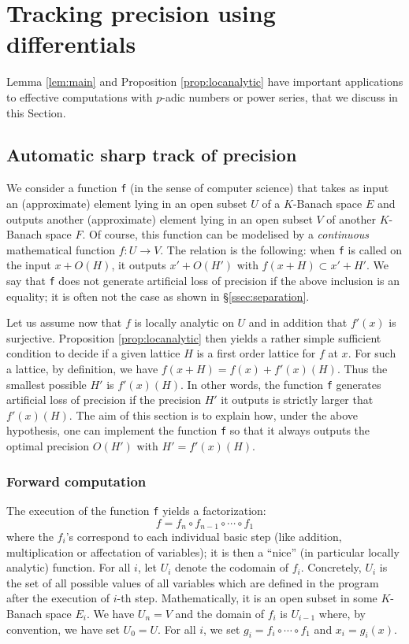 \documentclass{lms}
\begin{document}
\section{Tracking precision using differentials}
\label{sec:tracking}

Lemma \ref{lem:main} and Proposition \ref{prop:locanalytic} have 
important applications to effective computations with $p$-adic numbers 
or power series, that we discuss in this Section. 

\subsection{Automatic sharp track of precision}

We consider a function {\tt f} (in the sense of computer 
science) that takes as input an (approximate) element lying in an open 
subset $U$ of a $K$-Banach space $E$ and outputs another (approximate) 
element lying in an open subset $V$ of another $K$-Banach space $F$. Of 
course, this function can be modelised by a \emph{continuous} 
mathematical function $f : U \to V$. The relation is the following: when 
{\tt f} is called on the input $x + O(H)$, it outputs $x' + O(H')$ with 
$f(x+H) \subset x' + H'$. We say that {\tt f} does not generate 
artificial loss of precision if the above inclusion is an equality; it is 
often not the case as shown in \S \ref{ssec:separation}.

Let us assume now that $f$ is locally analytic on $U$ and in addition 
that $f'(x)$ is surjective. Proposition \ref{prop:locanalytic} then 
yields a rather simple sufficient condition to decide if a given lattice 
$H$ is a first order lattice for $f$ at $x$. For such a lattice, by 
definition, we have $f(x+H) = f(x) + f'(x)(H)$. Thus the smallest 
possible $H'$ is $f'(x)(H)$. In other words, the function {\tt f} 
generates artificial loss of precision if the precision $H'$ it outputs 
is strictly larger that $f'(x)(H)$. The aim of this section is to 
explain how, under the above hypothesis, one can implement the function 
{\tt f} so that it always outputs the optimal precision $O(H')$ with $H' 
= f'(x)(H)$.

\subsubsection*{Forward computation}

The execution of the function {\tt f} yields a factorization:
$$f = f_n \circ f_{n-1} \circ \cdots \circ f_1$$
where the $f_i$'s correspond to each individual basic step (like 
addition, multiplication or affectation of variables); it is then a
``nice'' (in particular locally analytic) function. For all 
$i$, let $U_i$ denote the codomain of $f_i$. Concretely, $U_i$ is the 
set of all possible values of all variables which are defined in the 
program after the execution of $i$-th step. Mathematically, it is an 
open subset in some $K$-Banach space $E_i$. We have $U_n = V$ and the 
domain of $f_i$ is $U_{i-1}$ where, by convention, we have set $U_0 = 
U$.
For all $i$, we set $g_i = f_i \circ \cdots \circ f_1$ and $x_i = 
g_i(x)$. 
\end{document}
